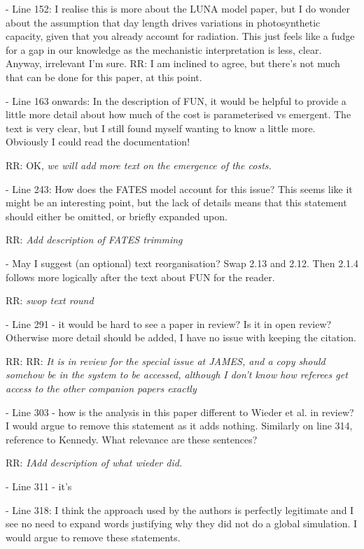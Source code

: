 \documentclass{article}
\begin{document}
- Line 152: I realise this is more about the LUNA model paper, but I do wonder about the assumption that day length drives variations in photosynthetic capacity, given that you already account for radiation. This just feels like a fudge for a gap in our knowledge as the mechanistic interpretation is less, clear. Anyway, irrelevant I'm sure. 
RR: I am inclined to agree, but there's not much that can be done for this paper, at this point. 

- Line 163 onwards: In the description of FUN, it would be helpful to provide a little more detail about how much of the cost is parameterised vs emergent. The text is very clear, but I still found myself wanting to know a little more. Obviously I could read the documentation! 

RR: OK, \emph{we will add more text on the emergence of the costs.}

- Line 243: How does the FATES model account for this issue? This seems like it might be an interesting point, but the lack of details means that this statement should either be omitted, or briefly expanded upon. 

RR: \emph{Add description of FATES trimming}

- May I suggest (an optional) text reorganisation? Swap 2.13 and 2.12. Then 2.1.4 follows more logically after the text about FUN for the reader. 

RR: \emph{swop text round}

- Line 291 - it would be hard to see a paper in review? Is it in open review? Otherwise more detail should be added, I have no issue with keeping the citation. 

RR: RR: \emph{It is in review for the special issue at JAMES, and a copy should somehow be in the system to be accessed, although I don't know how referees get access to the other companion papers exactly}

- Line 303 - how is the analysis in this paper different to Wieder et al. in review? I would argue to remove this statement as it adds nothing. Similarly on line 314, reference to Kennedy. What relevance are these sentences? 

RR: \emph{IAdd description of what wieder did.}

- Line 311 - it's 

- Line 318: I think the approach used by the authors is perfectly legitimate and I see no need to expand words justifying why they did not do a global simulation. I would argue to remove these statements. 
\end{document}

